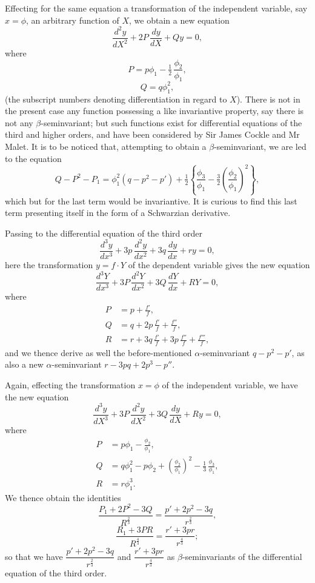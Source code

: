 \documentclass[11pt]{article}
\begin{document}
\medskip

\noindent Effecting for the same equation a transformation of the independent variable, say $x = \phi$, an arbitrary function of $X$, we obtain a new equation
\[
\frac{d^2y}{dX^2} + 2P\,\frac{dy}{dX} + Qy = 0,
\]
where
\[
P = p\phi_1 - \tfrac{1}{2}\,\frac{\phi_2}{\phi_1},
\]
\[
Q = q\phi_1^2,
\]
(the subscript numbers denoting differentiation in regard to $X$). There is not in the present case any function possessing a like invariantive property, say there is not any $\beta$-seminvariant; but such functions exist for differential equations of the third and higher orders, and have been considered by Sir James Cockle and Mr Malet. It is to be noticed that, attempting to obtain a $\beta$-seminvariant, we are led to the equation
\[
Q - P^2 - P_1 = \phi_1^2(q - p^2 - p') + \tfrac{1}{2}\left\{\frac{\phi_3}{\phi_1} - \tfrac{3}{2}\!\left(\frac{\phi_2}{\phi_1}\right)^{\!2}\right\},
\]
which but for the last term would be invariantive. It is curious to find this last term presenting itself in the form of a Schwarzian derivative.

\medskip

\noindent Passing to the differential equation of the third order
\[
\frac{d^3y}{dx^3} + 3p\,\frac{d^2y}{dx^2} + 3q\,\frac{dy}{dx} + ry = 0,
\]
here the transformation $y = f\cdot Y$ of the dependent variable gives the new equation
\[
\frac{d^3Y}{dx^3} + 3P\,\frac{d^2Y}{dx^2} + 3Q\,\frac{dY}{dx} + RY = 0,
\]
where
\begin{align*}
P &= p + \frac{f'}{f},\\
Q &= q + 2p\,\frac{f'}{f} + \frac{f''}{f},\\
R &= r + 3q\,\frac{f'}{f} + 3p\,\frac{f''}{f} + \frac{f'''}{f},
\end{align*}
and we thence derive as well the before-mentioned $\alpha$-seminvariant $q - p^2 - p'$, as also a new $\alpha$-seminvariant $r - 3pq + 2p^3 - p''$.

\medskip

\noindent Again, effecting the transformation $x = \phi$ of the independent variable, we have the new equation
\[
\frac{d^3y}{dX^3} + 3P\,\frac{d^2y}{dX^2} + 3Q\,\frac{dy}{dX} + Ry = 0,
\]
where
\begin{align*}
P &= p\phi_1 - \frac{\phi_2}{\phi_1},\\
Q &= q\phi_1^2 - p\phi_2 + \left(\frac{\phi_2}{\phi_1}\right)^{\!2} - \tfrac{1}{3}\,\frac{\phi_3}{\phi_1},\\
R &= r\phi_1^3.
\end{align*}
We thence obtain the identities
\[
\frac{P_1 + 2P^2 - 3Q}{R^{\frac{2}{3}}} = \frac{p' + 2p^2 - 3q}{r^{\frac{2}{3}}},
\]
\[
\frac{R_1 + 3PR}{R^{\frac{4}{3}}} = \frac{r' + 3pr}{r^{\frac{4}{3}}};
\]
so that we have $\dfrac{p' + 2p^2 - 3q}{r^{\frac{2}{3}}}$ and $\dfrac{r' + 3pr}{r^{\frac{4}{3}}}$ as $\beta$-seminvariants of the differential equation of the third order.
\end{document}
